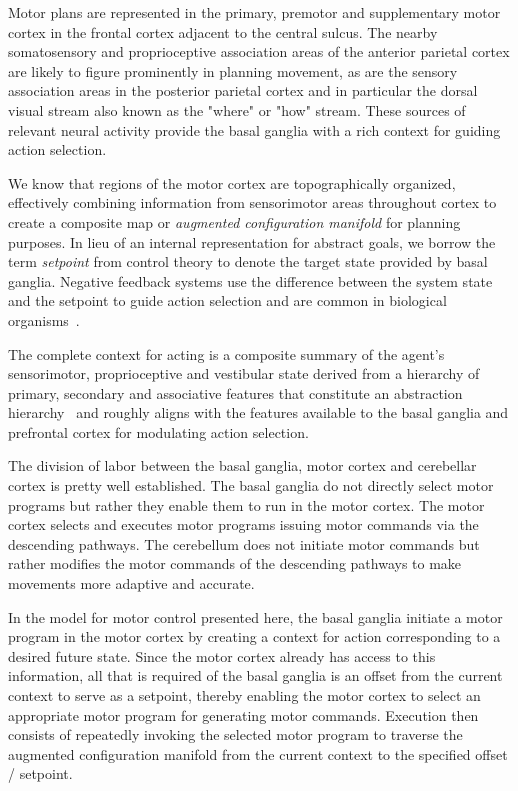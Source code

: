 Motor plans are represented in the primary, premotor and supplementary motor cortex in the frontal cortex adjacent to the central sulcus. The nearby somatosensory and proprioceptive association areas of the anterior parietal cortex are likely to figure prominently in planning movement, as are the sensory association areas in the posterior parietal cortex and in particular the dorsal visual stream also known as the "where" or "how" stream. These sources of relevant neural activity provide the basal ganglia with a rich context for guiding action selection.

We know that regions of the motor cortex are topographically organized, effectively combining information from sensorimotor areas throughout cortex to create a composite map or {\it{augmented configuration manifold}} for planning purposes. In lieu of an internal representation for abstract goals, we borrow the term {\it{setpoint}} from control theory to denote the target state provided by basal ganglia. Negative feedback systems use the difference between the system state and the setpoint to guide action selection and are common in biological organisms~\cite{Ashby1957cybernetics}.

The complete context for acting is a composite summary of the agent's sensorimotor, proprioceptive and vestibular state derived from a hierarchy of primary, secondary and associative features that constitute an abstraction hierarchy~\cite{FusterPREFRONTAL-CORTEX-15-CHAPTER_8} and roughly aligns with the features available to the basal ganglia and prefrontal cortex for modulating action selection.

The division of labor between the basal ganglia, motor cortex and cerebellar cortex is pretty well established. The basal ganglia do not directly select motor programs but rather they enable them to run in the motor cortex. The motor cortex selects and executes motor programs issuing motor commands via the descending pathways. The cerebellum does not initiate motor commands but rather modifies the motor commands of the descending pathways to make movements more adaptive and accurate. 

In the model for motor control presented here, the basal ganglia initiate a motor program in the motor cortex by creating a context for action corresponding to a desired future state. Since the motor cortex already has access to this information, all that is required of the basal ganglia is an offset from the current context to serve as a setpoint, thereby enabling the motor cortex to select an appropriate motor program for generating motor commands. Execution then consists of repeatedly invoking the selected motor program to traverse the augmented configuration manifold from the current context to the specified offset / setpoint.


